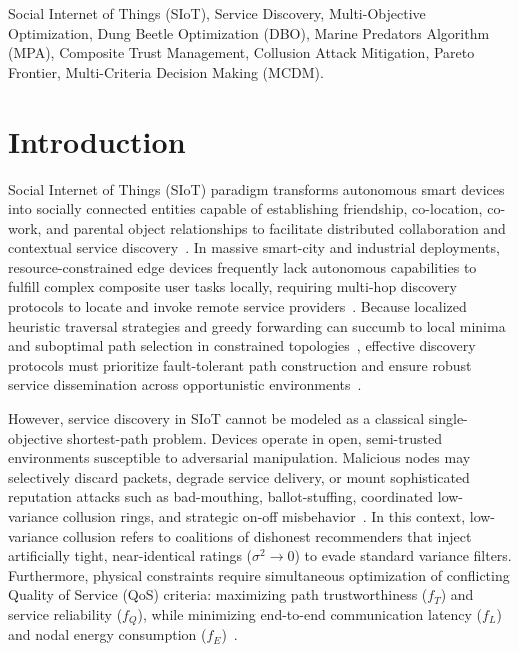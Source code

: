 \documentclass[journal,compsoc]{IEEEtran}
\begin{document}
\begin{IEEEkeywords}
Social Internet of Things (SIoT), Service Discovery, Multi-Objective Optimization, Dung Beetle Optimization (DBO), Marine Predators Algorithm (MPA), Composite Trust Management, Collusion Attack Mitigation, Pareto Frontier, Multi-Criteria Decision Making (MCDM).
\end{IEEEkeywords}

\section{Introduction}
 Social Internet of Things (SIoT) paradigm transforms autonomous smart devices into socially connected entities capable of establishing friendship, co-location, co-work, and parental object relationships to facilitate distributed collaboration and contextual service discovery~\cite{marche2020how, rad2020social}. In massive smart-city and industrial deployments, resource-constrained edge devices frequently lack autonomous capabilities to fulfill complex composite user tasks locally, requiring multi-hop discovery protocols to locate and invoke remote service providers~\cite{chahal2020secure, nitti2021trust}. Because localized heuristic traversal strategies and greedy forwarding can succumb to local minima and suboptimal path selection in constrained topologies~\cite{marche2020how, khattak2022social}, effective discovery protocols must prioritize fault-tolerant path construction and ensure robust service dissemination across opportunistic environments~\cite{zhang2023hybrid, sagar2023understanding}.

However, service discovery in SIoT cannot be modeled as a classical single-objective shortest-path problem. Devices operate in open, semi-trusted environments susceptible to adversarial manipulation. Malicious nodes may selectively discard packets, degrade service delivery, or mount sophisticated reputation attacks such as bad-mouthing, ballot-stuffing, coordinated low-variance collusion rings, and strategic on-off misbehavior~\cite{butun2020security, zhang2025trust, jung2025social}. In this context, low-variance collusion refers to coalitions of dishonest recommenders that inject artificially tight, near-identical ratings ($\sigma^2 \to 0$) to evade standard variance filters. Furthermore, physical constraints require simultaneous optimization of conflicting Quality of Service (QoS) criteria: maximizing path trustworthiness ($f_T$) and service reliability ($f_Q$), while minimizing end-to-end communication latency ($f_L$) and nodal energy consumption ($f_E$)~\cite{wang2022cooperative, brik2020qos}.
\end{document}
